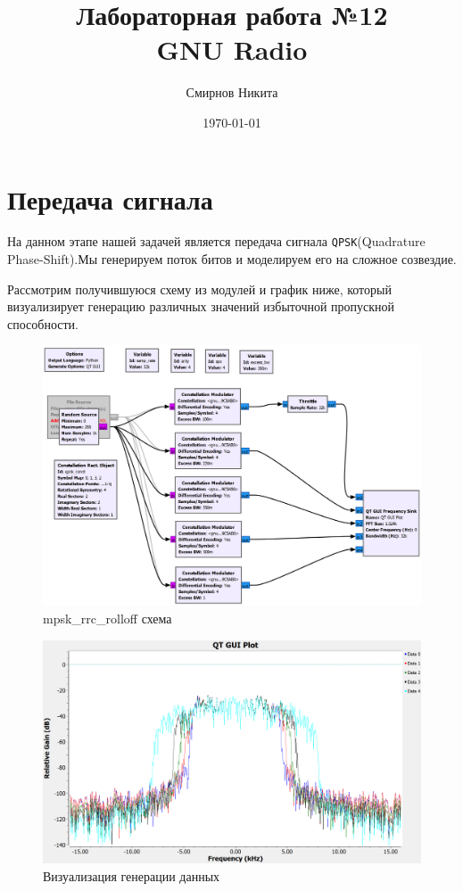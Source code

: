 \documentclass[a4paper,12pt]{report}
\title{Лабораторная работа №12\\GNU Radio}
\author{Смирнов Никита}
\date{\today}
\begin{document}
\maketitle
\tableofcontents
\listoffigures

\maketitle

\chapter{Передача сигнала}

На данном этапе нашей задачей является передача сигнала \texttt{QPSK}(Quadrature Phase-Shift).Мы генерируем поток битов и моделируем его на сложное созвездие. 

Рассмотрим получившуюся схему из модулей и график ниже, который визуализирует генерацию различных значений избыточной пропускной способности. 

\begin{figure}[H]
        \centering
        \includegraphics[width=1.0\textwidth]{1.png}
        \caption{mpsk\_rrc\_rolloff схема}
        \label{fig:lab11_fig3_1}
\end{figure}

\begin{figure}[H]
        \centering
        \includegraphics[width=1.0\textwidth]{2.png}
        \caption{Визуализация генерации данных}
        \label{fig:lab12_fig1_2}
\end{figure}
\end{document}
